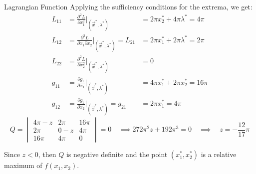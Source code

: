 \documentclass[
    NAME={Dr. Helga Ingimundardóttir},
    EMAIL={helgaingim@hi.is},
    FACULTY={Industrial Engineering},
    TITLE={Nonlinear Optimization},
    SUBTITLE={Approaches and Challenges},
    SEMINAR={VÉL113F},
    DATE={Design and Optimization}
]{../HI-latex/hi-beamer}
\begin{document}
\begin{frame}{Lagrangian Function}
        Applying the \alert{sufficiency conditions} for the extrema, we get:\noframebreak
        {\tiny\begin{align*}
                  L_{11} &= \frac{\partial^2 L}{\partial x_1^2}\Big|_{(\vec{x}^*,\lambda^*)} &= 2\pi x_2^*+4\pi\lambda^*=4\pi \\
                  L_{12} &= \frac{\partial^2 L}{\partial x_1 \partial x_2}\Big|_{(\vec{x}^*,\lambda^*)} = L_{21}
                  &= 2\pi x_1^*+2\pi\lambda^* = 2\pi \\
                  L_{22} &= \frac{\partial^2 L}{\partial x_2^2}\Big|_{(\vec{x}^*,\lambda^*)} &= 0 \\
                  g_{11} &= \frac{\partial g_1}{\partial x_1}\Big|_{(\vec{x}^*,\lambda^*)} &= 4\pi x_1^*+2\pi x_2^*=16\pi\\
                  g_{12} &= \frac{\partial g_1}{\partial x_2}\Big|_{(\vec{x}^*,\lambda^*)} = g_{21} &= 2\pi x_1^*=4\pi
        \end{align*}}
        {\scriptsize\[ Q= \begin{vmatrix}
                              4\pi-z & 2\pi & 16\pi \\ 2\pi & 0-z & 4\pi \\ 16\pi & 4\pi & 0
        \end{vmatrix}=0
        \quad \implies 272\pi^2 z+192\pi^3=0
        \quad \implies \quad z=-\frac{12}{17}\pi \]}

        Since $z<0$, then $Q$ is negative definite and the point $(x_1^*,x_2^*)$ is a relative maximum
        of $f(x_1,x_2)$.

    \end{frame}
\end{document}
